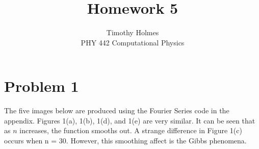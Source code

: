 \documentclass[12pt]{article}
\begin{document}
 
 
\title{Homework 5}
\author{Timothy Holmes\\ %
PHY 442 Computational Physics}

\maketitle

\section*{Problem 1}

The five images below are produced using the Fourier Series code in the appendix. Figures 1(a), 1(b), 1(d), and 1(e) are very similar. It can be seen that as $n$ increases, the function smooths out. A strange difference in Figure 1(c) occurs when n = 30. However, this smoothing affect is the Gibbs phenomena. 
\end{document}
